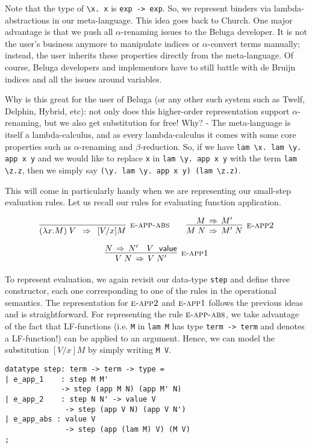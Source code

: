 Note that the type of \lstinline!\x. x! is \lstinline!exp -> exp!. So,
we represent binders  via lambda-abstractions in our
meta-language. This idea goes back to Church. One major advantage is
that we push all $\alpha$-renaming issues to the Beluga developer. It
is not the user's business anymore to manipulate indices or
$\alpha$-convert terms manually; instead, the user inherits these
properties directly from the meta-language. Of course, Beluga developers and
implementors have to still battle with de Bruijn indices and all the issues
around variables.  

Why is this great for the user of Beluga (or any other such system such as Twelf, Delphin, Hybrid, etc): not only does this higher-order representation support $\alpha$-renaming, but we also get substitution for free! Why?  - The meta-language is itself a lambda-calculus, and as every lambda-calculus it comes with some core properties such as $\alpha$-renaming and $\beta$-reduction. So, if we
have \lstinline!lam \x. lam \y. app x y! and we would like to replace
\lstinline!x! in \lstinline!lam \y. app x y! with the term
\lstinline!lam \z.z!, then we simply say 
\lstinline!(\y. lam \y. app x y) (lam \z.z)!.

This will come in particularly handy when we are representing our small-step
evaluation rules. Let us recall our rules for evaluating function application.

\[
\begin{array}{c}
\infer[\SAppBeta]{(\lambda x.M)\;V ~\step~ [V/x]M}{} \qquad
\infer[\SAppArgStep]{M\;N \step M'\;N}{M \step M'} \\[1em]
\infer[\SAppFnStep]{V\;N \step V\;N'}{N \step N' & V~\isv}
\end{array}
\]

To represent evaluation, we again revisit our data-type
\lstinline!step! and define three constructor, each one corresponding to one of
the rules in the operational semantics. The representation for $\textsc{e-app2}$
and $\textsc{e-app1}$ follows the previous ideas and is straightforward. For
representing the rule $\textsc{e-app-abs}$, we take advantage of the fact that
LF-functions (i.e. \lstinline!M! in \lstinline!lam M! has type 
\lstinline!term -> term! and denotes a LF-function!) can be applied to an
argument. Hence, we can model the substitution $[V/x]M$ by simply writing
\lstinline!M V!.

\begin{lstlisting}
datatype step: term -> term -> type = 
| e_app_1    : step M M'
             -> step (app M N) (app M' N)
| e_app_2    : step N N' -> value V              
              -> step (app V N) (app V N')
| e_app_abs : value V
              -> step (app (lam M) V) (M V)
;
\end{lstlisting}

